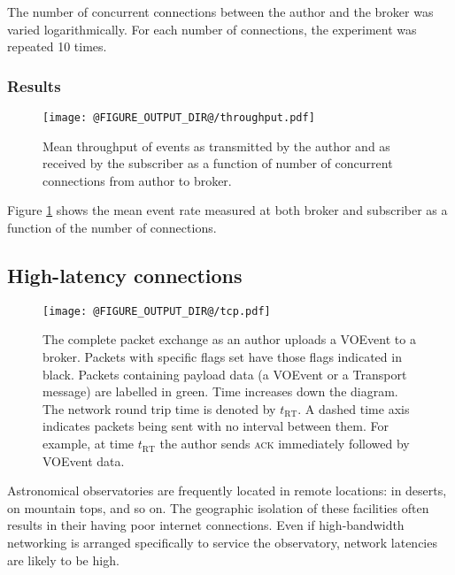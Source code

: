 \documentclass[5p,authoryear]{elsarticle}
\begin{document}
The number of concurrent connections between the author and the broker was
varied logarithmically. For each number of connections, the experiment was
repeated 10 times.

\subsubsection{Results}
\label{sec:perf:total:results}

\begin{figure}
  \begin{center}
  \texttt{[image: @FIGURE\_OUTPUT\_DIR@/throughput.pdf]}
  \end{center}

  \caption{Mean throughput of events as transmitted by the author and as
  received by the subscriber as a function of number of concurrent connections
  from author to broker.}

  \label{fig:throughput}
\end{figure}

Figure \ref{fig:throughput} shows the mean event rate measured at both broker
and subscriber as a function of the number of connections. 

\subsection{High-latency connections}
\label{sec:perf:highlatency}

\begin{figure}
  \begin{center}
  \texttt{[image: @FIGURE\_OUTPUT\_DIR@/tcp.pdf]}
  \end{center}

  \caption{The complete packet exchange as an author uploads a VOEvent to a
  broker. Packets with specific flags set have those flags indicated in black.
  Packets containing payload data (a VOEvent or a Transport message) are
  labelled in green.  Time increases down the diagram. The network round trip
  time is denoted by $t_\mathrm{RT}$. A dashed time axis indicates packets
  being sent with no interval between them. For example, at time
  $t_\mathrm{RT}$ the author sends \textsc{ack} immediately followed by
  VOEvent data.}

  \label{fig:tcp}
\end{figure}

Astronomical observatories are frequently located in remote locations: in
deserts, on mountain tops, and so on. The geographic isolation of these
facilities often results in their having poor internet connections. Even if
high-bandwidth networking is arranged specifically to service the observatory,
network latencies are likely to be high.
\end{document}
